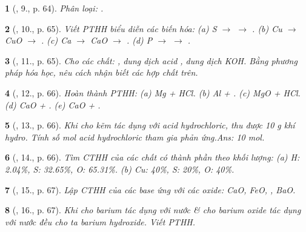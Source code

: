 \documentclass{article}
\newtheorem{baitoan}{}
\begin{document}
\begin{baitoan}[\cite{An_Hoa_Hoc_nang_cao_8_9}, 9., p. 64]
	Phân loại: {\rm{}}.
\end{baitoan}

\begin{baitoan}[\cite{An_Hoa_Hoc_nang_cao_8_9}, 10., p. 65]
	Viết {\rm PTHH} biểu diễn các biến hóa: (a) {\rm S $\to$  $\to$ }. (b) {\rm Cu $\to$ CuO $\to$ }. (c) {\rm Ca $\to$ CaO $\to$ }. (d) {\rm P $\to$  $\to$ }.
\end{baitoan}

\begin{baitoan}[\cite{An_Hoa_Hoc_nang_cao_8_9}, 11., p. 65]
	Cho các chất: {\rm{}}, dung dịch acid {\rm{}}, dung dịch {\rm KOH}. Bằng phương pháp hóa học, nêu cách nhận biết các hợp chất trên.
\end{baitoan}

\begin{baitoan}[\cite{An_Hoa_Hoc_nang_cao_8_9}, 12., p. 66]
	Hoàn thành {\rm PTHH}: (a) {\rm Mg + HCl}. (b) {\rm Al + }. (c) {\rm MgO + HCl}. (d) {\rm CaO + }. (e) {\rm CaO + }.
\end{baitoan}

\begin{baitoan}[\cite{An_Hoa_Hoc_nang_cao_8_9}, 13., p. 66]
	Khi cho kẽm tác dụng với acid hydrochloric, thu được {\rm10 g} khí hydro. Tính số mol acid hydrochloric tham gia phản ứng.\hfill{\sf Ans: 10 mol.}
\end{baitoan}

\begin{baitoan}[\cite{An_Hoa_Hoc_nang_cao_8_9}, 14., p. 66]
	Tìm {\rm CTHH} của các chất có thành phần theo khối lượng: {\rm(a) H: 2.04\%, S: 32.65\%, O: 65.31\%. (b) Cu: 40\%, S: 20\%, O: 40\%}.
\end{baitoan}

\begin{baitoan}[\cite{An_Hoa_Hoc_nang_cao_8_9}, 15., p. 67]
	Lập {\rm CTHH} của các base ứng với các oxide: {\rm CaO, FeO, , BaO}.
\end{baitoan}

\begin{baitoan}[\cite{An_Hoa_Hoc_nang_cao_8_9}, 16., p. 67]
	Khi cho barium tác dụng với nước \& cho barium oxide tác dụng với nước đều cho ta barium hydroxide. Viết {\rm PTHH}.
\end{baitoan}
\end{document}
